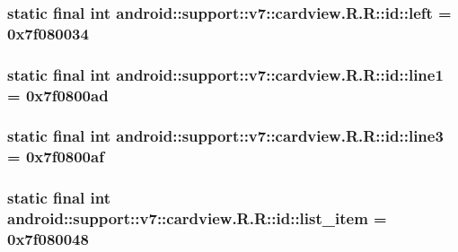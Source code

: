 \hypertarget{classandroid_1_1support_1_1v7_1_1cardview_1_1_r_1_1id_73ab07454461a9fe6fb22af79593039b}{
\subsubsection[{left}]{\setlength{\rightskip}{0pt plus 5cm}static final int android::support::v7::cardview.R.R::id::left = 0x7f080034}}
\label{classandroid_1_1support_1_1v7_1_1cardview_1_1_r_1_1id_73ab07454461a9fe6fb22af79593039b}


\hypertarget{classandroid_1_1support_1_1v7_1_1cardview_1_1_r_1_1id_39878428f982fdfab8a28159a8a36e5c}{
\subsubsection[{line1}]{\setlength{\rightskip}{0pt plus 5cm}static final int android::support::v7::cardview.R.R::id::line1 = 0x7f0800ad}}
\label{classandroid_1_1support_1_1v7_1_1cardview_1_1_r_1_1id_39878428f982fdfab8a28159a8a36e5c}


\hypertarget{classandroid_1_1support_1_1v7_1_1cardview_1_1_r_1_1id_b46839b5b24d35c4ca764dd192ab4ae1}{
\subsubsection[{line3}]{\setlength{\rightskip}{0pt plus 5cm}static final int android::support::v7::cardview.R.R::id::line3 = 0x7f0800af}}
\label{classandroid_1_1support_1_1v7_1_1cardview_1_1_r_1_1id_b46839b5b24d35c4ca764dd192ab4ae1}


\hypertarget{classandroid_1_1support_1_1v7_1_1cardview_1_1_r_1_1id_2c53886c2c1a35a501675debf4581e37}{
\subsubsection[{list\_\-item}]{\setlength{\rightskip}{0pt plus 5cm}static final int android::support::v7::cardview.R.R::id::list\_\-item = 0x7f080048}}
\label{classandroid_1_1support_1_1v7_1_1cardview_1_1_r_1_1id_2c53886c2c1a35a501675debf4581e37}


